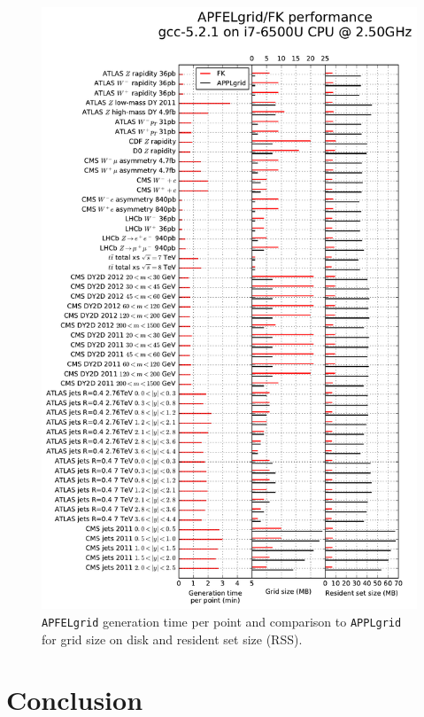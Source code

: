 \documentclass[preprint,12pt]{elsarticle}
\begin{document}
\begin{figure}
  \centering                                      
  \includegraphics[scale=0.6]{plots/t0b}
\caption{\small {\tt APFELgrid} generation time per point and
  comparison to {\tt APPLgrid} for grid size on disk and resident set size
  (RSS).}
\label{fig:performance}
\end{figure}

\section{Conclusion}\label{sec:conclusion}
\end{document}
